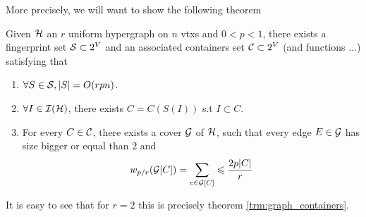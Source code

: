 More precisely, we will want to show the following theorem
\begin{theorem}
	\label{trm:containers_wp}
	Given $\mathcal{H}$ an $r$ uniform hypergraph on $n$ vtxs and $0 < p < 1$,
	there exists a fingerprint set $\mathcal{S} \subset 2^V$ and an associated
	containers set $\mathcal{C} \subset 2^V$ (and functions ...) satisfying that
	\begin{enumerate}
		\item $\forall S \in \mathcal{S}, |S| = O(rpn)$.
		\item $\forall I \in \mathcal{I}(\mathcal{H})$, there exists $C = C(S(I))$ s.t $I \subset C$.
		\item For every $C \in \mathcal{C}$, there exists a cover $\mathcal{G}$ of $\mathcal{H}$,
			such that every edge $E \in \mathcal{G}$
			has size bigger or equal than $2$ and
			\[
				w_{p/r}(\mathcal{G}[C]) = \sum_{e \in \mathcal{G}[C]}  \leqslant \frac{2p|C|}{r}
			\]
	\end{enumerate}
\end{theorem}
It is easy to see that for $r = 2$ this is precisely theorem
\ref{trm:graph_containers}.

